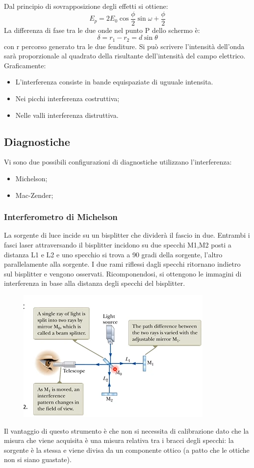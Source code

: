 \documentclass{article}
\begin{document}
Dal principio di sovrapposizione degli effetti si ottiene:\begin{equation}
    E_{p}=2E_{0}\cos{\frac{\phi}{2}}\sin{\omega+\frac{\phi}{2}}
\end{equation}
La differenza di fase tra le due onde nel punto P dello schermo è:\begin{equation}
    \delta=r_{1}-r_{2}=d\sin{\theta}
\end{equation}
con r percorso generato tra le due fenditure.
Si può scrivere l'intensità dell'onda sarà proporzionale al quadrato della risultante dell'intensità del campo elettrico. Graficamente:\begin{itemize}
    \item L'interferenza consiste in bande equispaziate di uguuale intensita.
    \item Nei picchi interferenza costruttiva;
    \item Nelle valli interferenza distruttiva.
\end{itemize}
\subsection{Diagnostiche}
Vi sono due possibili configurazioni di diagnostiche utilizzano l'interferenza:\begin{itemize}
    \item Michelson;
    \item Mac-Zender;
\end{itemize}
\subsubsection{Interferometro di Michelson}
La sorgente di luce incide su un bisplitter che dividerà il fascio in due. Entrambi i fasci laser attraversando il bisplitter incidono su due specchi M1,M2 posti a distanza L1 e L2 e uno specchio si trova a 90 gradi della sorgente, l'altro parallelamente alla sorgente.\newline
I due rami riflessi dagli specchi ritornano indietro sul bisplitter e vengono osservati. Ricomponendosi, si ottengono le immagini di interferenza in base alla distanza degli specchi del bisplitter.
\begin{figure}
    \includegraphics[scale=0.4]{2022-05-29-15-59-34.png}%
\end{figure}
Il vantaggio di questo strumento è che non si necessita di calibrazione dato che la misura che viene acquisita è una misura relativa tra i bracci degli specchi: la sorgente è la stessa e viene divisa da un componente ottico (a patto che le ottiche non si siano guastate).
\end{document}
